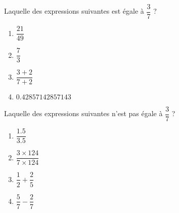 
\begin{exercice}\label{exo2smath-0088}

    Laquelle des expressions suivantes est égale à \( \dfrac{ 3 }{ 7 }\) ?
    \begin{multicols}{4}
        \begin{enumerate}
            \item
                \( \dfrac{ 21 }{ 49 }\)
            \item
                \( \dfrac{ 7 }{ 3 }\)
            \item
                \( \dfrac{ 3+2 }{ 7+2 }\)
            \item
    $0.42857142857143$
        \end{enumerate}
    \end{multicols}

    Laquelle des expressions suivantes n'est pas égale à \( \dfrac{ 3 }{ 7 }\) ?
    \begin{multicols}{4}
        \begin{enumerate}
            \item
                \( \dfrac{ 1.5 }{ 3.5 }\)
            \item
                \( \dfrac{ 3\times 124 }{ 7\times 124 }\)
            \item
                \( \dfrac{ 1 }{ 2 }+\dfrac{ 2 }{ 5 }\)
            \item
                \( \dfrac{ 5 }{ 7 }-\dfrac{ 2 }{ 7 }\)
        \end{enumerate}
    \end{multicols}

\end{exercice}
